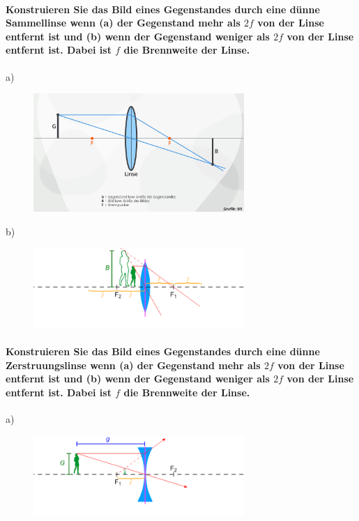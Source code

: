 \documentclass[a4paper, 11pt, parskip=half]{scrartcl}
\begin{document}
\paragraph{Konstruieren Sie das Bild eines Gegenstandes durch eine dünne Sammellinse wenn (a) der
Gegenstand mehr als $2f$ von der Linse entfernt ist und (b) wenn der Gegenstand weniger als $2f$ von
der Linse entfernt ist. Dabei ist $f$ die Brennweite der Linse.}

a)
\begin{figure}[H]
    \centering
    \includegraphics[width=8cm]{image/17/geo15a}
\end{figure}



b)
\begin{figure}[H]
    \centering
    \includegraphics[width=8cm]{image/17/geo15b}
\end{figure}







\paragraph{Konstruieren Sie das Bild eines Gegenstandes durch eine dünne Zerstruungslinse wenn (a)
der Gegenstand mehr als $2f$ von der Linse entfernt ist und (b) wenn der Gegenstand weniger
als $2f$ von der Linse entfernt ist. Dabei ist $f$ die Brennweite der Linse.}


a)
\begin{figure}[H]
    \centering
    \includegraphics[width=8cm]{image/17/geo16a}
\end{figure}
\end{document}
